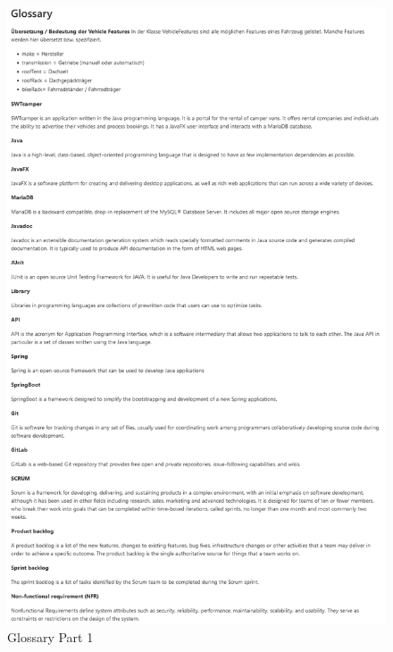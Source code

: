 \begin{figure}[h]
	\centering
	\includegraphics[width=15cm]{resources/images/glossary_1.png}
	\caption{Glossary Part 1}
	\label{fig:glossary_1}
\end{figure}


